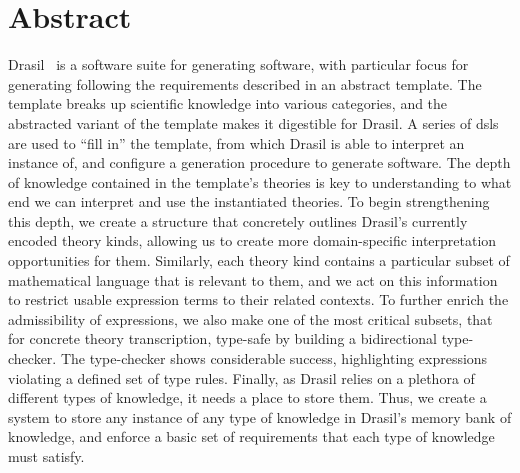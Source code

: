 \chapter{Abstract}
\label{chap:abstract}

Drasil~\cite{Drasil2021} is a software suite for generating software, with
particular focus for generating  following the requirements described
in an abstract  template. The template breaks up scientific knowledge
into various categories, and the abstracted variant of the template makes it
digestible for Drasil. A series of \acsp{dsl} are used to ``fill in'' the
template, from which Drasil is able to interpret an instance of, and configure a
generation procedure to generate software. The depth of knowledge contained in
the template's theories is key to understanding to what end we can interpret and
use the instantiated theories. To begin strengthening this depth, we create a
structure that concretely outlines Drasil's currently encoded theory kinds,
allowing us to create more domain-specific interpretation opportunities for
them. Similarly, each theory kind contains a particular subset of mathematical
language that is relevant to them, and we act on this information to restrict
usable expression terms to their related contexts. To further enrich the
admissibility of expressions, we also make one of the most critical subsets,
that for concrete theory transcription, type-safe by building a bidirectional
type-checker. The type-checker shows considerable success, highlighting
expressions violating a defined set of type rules. Finally, as Drasil relies on
a plethora of different types of knowledge, it needs a place to store them.
Thus, we create a system to store any instance of any type of knowledge in
Drasil's memory bank of knowledge, and enforce a basic set of requirements that
each type of knowledge must satisfy.
